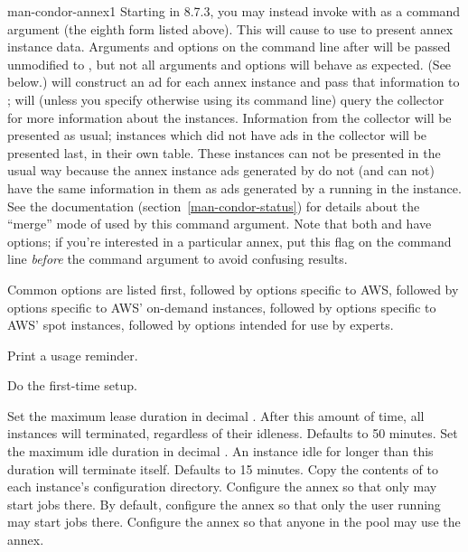 \begin{ManPage}{}{man-condor-annex}{1}
Starting in 8.7.3, you may instead invoke  with 
as a command argument (the eighth form listed above).  This will cause  to use 
to present annex instance data.  Arguments and options on the command line
after  will be passed unmodified to , but not
all arguments and options will behave as expected.  (See below.)
 will construct an ad for each annex instance and pass that
information to ;  will (unless you specify
otherwise using its command line) query the collector for more information
about the instances.  Information from the collector will be presented as
usual; instances which did not have ads in the collector will be presented
last, in their own table.  These instances can not be presented in the
usual way because the annex instance ads generated by  do not
(and can not) have the same information in them as ads generated by a
 running in the instance.  See the 
documentation (section~\ref{man-condor-status}) for details about the ``merge'' mode of
 used by this command argument.  Note that both 
and  have  options; if you're interested
in a particular annex, put this flag on the command line \emph{before}
the  command argument to avoid confusing results.

Common options are listed first, followed by options specific to AWS,
followed by options specific to AWS' on-demand instances, followed by
options specific to AWS' spot instances, followed by options intended
for use by experts.

\begin{Options}
		{Print a usage reminder.}

		{Do the first-time setup.}

		{Set the maximum lease duration in decimal .  After this amount of time, all instances will terminated, regardless of their idleness.  Defaults to 50 minutes.}
		{Set the maximum idle duration in decimal .  An instance idle for longer than this duration will terminate itself.  Defaults to 15 minutes.}
		{Copy the contents of  to each instance's configuration directory.}
		{Configure the annex so that only  may start jobs there.  By default, configure the annex so that only the user running  may start jobs there.}
		{Configure the annex so that anyone in the pool may use the annex.}


\end{Options}
\end{ManPage}
